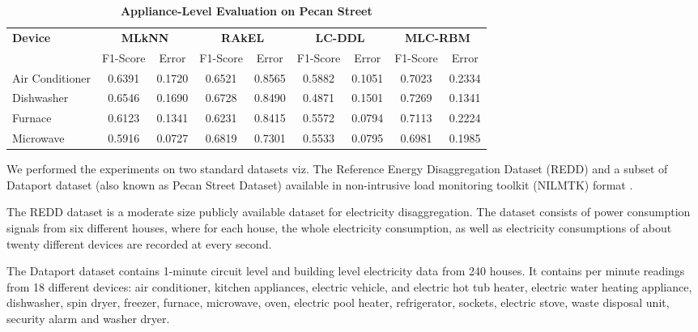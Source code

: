 \documentclass{article}
\begin{document}
\begin{table}[!ht]
\centering
\caption{\textbf{Appliance-Level Evaluation on Pecan Street} }
\label{tab2}
\begin{tabular}{l cc cc cc cc}
\toprule[0.2mm]


\multirow{2}{0.5cm}{\textbf{Device}}&\multicolumn{2}{c}{\textbf{MLkNN}}&\multicolumn{2}{c}{\textbf{RAkEL}}&\multicolumn{2}{c}{\textbf{LC-DDL}}&\multicolumn{2}{c}{\textbf{MLC-RBM}} \\
 &F1-Score &Error&F1-Score&Error &F1-Score&Error&F1-Score&Error\\
\midrule
Air Conditioner  &0.6391  &0.1720    &0.6521&0.8565      &0.5882 &0.1051      &0.7023 & 0.2334             \\

Dishwasher       &0.6546  &0.1690    &0.6728&0.8490               &0.4871 &0.1501      &0.7269 &0.1341    \\

Furnace          &0.6123  &0.1341    &0.6231&0.8415               &0.5572 &0.0794      &0.7113&0.2224    \\

Microwave        &0.5916  &0.0727    &0.6819&0.7301               &0.5533 &0.0795      &0.6981&0.1985    \\
\bottomrule[0.2mm]
\end{tabular}
\end{table}

We performed the experiments on two standard datasets viz. The Reference Energy Disaggregation Dataset (REDD) \cite{kolter2011redd} and a subset of Dataport dataset \cite{dp} (also known as Pecan Street Dataset) available in non-intrusive load monitoring toolkit (NILMTK) format\cite{batra2014nilmtk} .

The REDD dataset is a moderate size publicly available dataset for electricity disaggregation. The dataset consists of
power consumption signals from six different houses, where for each house, the whole electricity consumption, as well as
electricity consumptions of about twenty different devices are recorded at every second.

The Dataport dataset contains 1-minute circuit level and building level electricity data from 240 houses. It contains per minute readings from 18 different devices: air conditioner, kitchen appliances, electric vehicle, and electric hot tub heater, electric water heating appliance, dishwasher, spin dryer, freezer, furnace, microwave, oven, electric pool heater, refrigerator, sockets, electric stove, waste disposal unit, security alarm and washer dryer.
\end{document}

